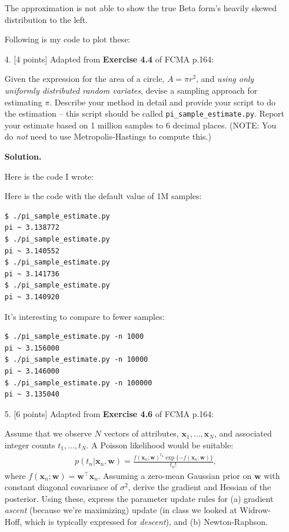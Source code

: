 \documentclass[10pt]{article}
\begin{document}
\begin{itemize}
The approximation is not able to show the true Beta form's heavily skewed distribution to the left.

Following is my code to plot these:



\item[4.]  [4 points]
Adapted from {\bf Exercise 4.4} of FCMA p.164:

Given the expression for the area of a circle, $A = \pi r^2$, and {\em using only uniformly distributed random variates}, devise a sampling approach for estimating $\pi$.  Describe your method in detail and provide your script to do the estimation -- this script should be called {\tt pi\_sample\_estimate.py}.  Report your estimate based on 1 million samples to 6 decimal places.  (NOTE: You do {\em not} need to use Metropolis-Hastings to compute this.)

{\bf Solution.} %

Here is the code I wrote:



Here is the code with the default value of 1M samples:

\begin{verbatim}
$ ./pi_sample_estimate.py
pi ~ 3.138772
$ ./pi_sample_estimate.py
pi ~ 3.140552
$ ./pi_sample_estimate.py
pi ~ 3.141736
$ ./pi_sample_estimate.py
pi ~ 3.140920
\end{verbatim}

It's interesting to compare to fewer samples:

\begin{verbatim}
$ ./pi_sample_estimate.py -n 1000
pi ~ 3.156000
$ ./pi_sample_estimate.py -n 10000
pi ~ 3.146000
$ ./pi_sample_estimate.py -n 100000
pi ~ 3.135040
\end{verbatim}

\item[5.]  [6 points]
Adapted from {\bf Exercise 4.6} of FCMA p.164:

Assume that we observe $N$ vectors of attributes, $\mathbf{x}_1, ..., \mathbf{x}_N$, and associated integer counts $t_1, ..., t_N$.  A Poisson likelihood would be suitable:
\begin{eqnarray*}
p(t_n | \mathbf{x}_n, \mathbf{w}) = \frac{f(\mathbf{x}_n; \mathbf{w})^{t_n} \exp \{ -f(\mathbf{x}_n; \mathbf{w}) \}}{t_n!},
\end{eqnarray*}
where $f(\mathbf{x}_n;\mathbf{w}) = \mathbf{w}^\top\mathbf{x}_n$.
Assuming a zero-mean Gaussian prior on $\mathbf{w}$ with constant diagonal covariance of $\sigma^2$, derive the gradient and Hessian of the posterior.  Using these, express the parameter update rules for (a) gradient {\em ascent} (because we're maximizing) update (in class we looked at Widrow-Hoff, which is typically expressed for {\em descent}), and (b) Newton-Raphson.


\end{itemize}
\end{document}

